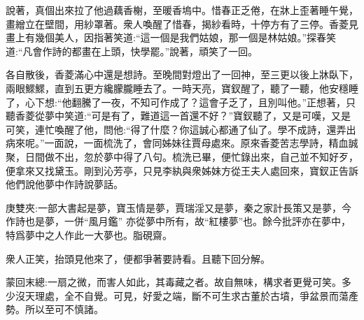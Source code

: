 \begin{parag}
    說著，真個出來拉了他過藕香榭，至暖香塢中。惜春正乏倦，在牀上歪著睡午覺，畫繒立在壁間，用紗罩著。衆人喚醒了惜春，揭紗看時，十停方有了三停。香菱見畫上有幾個美人，因指著笑道:“這一個是我們姑娘，那一個是林姑娘。”探春笑道:“凡會作詩的都畫在上頭，快學罷。”說著，頑笑了一回。
\end{parag}


\begin{parag}
    各自散後，香菱滿心中還是想詩。至晚間對燈出了一回神，至三更以後上牀臥下，兩眼鰥鰥，直到五更方纔朦朧睡去了。一時天亮，寶釵醒了，聽了一聽，他安穩睡了，心下想:“他翻騰了一夜，不知可作成了？這會子乏了，且別叫他。”正想著，只聽香菱從夢中笑道:“可是有了，難道這一首還不好？”寶釵聽了，又是可嘆，又是可笑，連忙喚醒了他，問他:“得了什麼？你這誠心都通了仙了。學不成詩，還弄出病來呢。”一面說，一面梳洗了，會同姊妹往賈母處來。原來香菱苦志學詩，精血誠聚，日間做不出，忽於夢中得了八句。梳洗已畢，便忙錄出來，自己並不知好歹，便拿來又找黛玉。剛到沁芳亭，只見李紈與衆姊妹方從王夫人處回來，寶釵正告訴他們說他夢中作詩說夢話。\begin{note}庚雙夾:一部大書起是夢，寶玉情是夢，賈瑞淫又是夢，秦之家計長策又是夢，今作詩也是夢，一併“風月鑑” 亦從夢中所有，故“紅樓夢”也。餘今批評亦在夢中，特爲夢中之人作此一大夢也。脂硯齋。\end{note}衆人正笑，抬頭見他來了，便都爭著要詩看。且聽下回分解。
\end{parag}


\begin{parag}
    \begin{note}蒙回末總:一扇之微，而害人如此，其毒藏之者。故自無味，構求者更覺可笑。多少沒天理處，全不自覺。可見，好愛之端，斷不可生求古董於古墳，爭盆景而蕩產勢。所以至可不慎諸。\end{note}
\end{parag}

